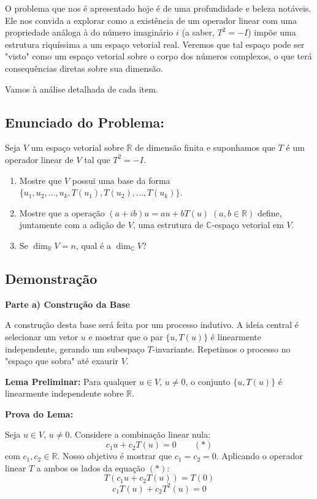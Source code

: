 O problema que nos é apresentado hoje é de uma profundidade e beleza notáveis. Ele nos convida a
explorar como a existência de um operador linear com uma propriedade análoga à do número
imaginário $i$ (a saber, $T^2=-I$) impõe uma estrutura riquíssima a um espaço vetorial real. Veremos
que tal espaço pode ser "visto" como um espaço vetorial sobre o corpo dos números complexos, o
que terá consequências diretas sobre sua dimensão.

Vamos à análise detalhada de cada item.

\subsection*{Enunciado do Problema:}

Seja $V$ um espaço vetorial sobre $\mathbb{R}$ de dimensão finita e suponhamos que $T$ é um operador linear de
$V$ tal que $T^2=-I$.

\begin{enumerate}[label=\alph*)]
\item Mostre que $V$ possui uma base da forma $\{u_1,u_2,\ldots,u_k,T(u_1),T(u_2),\ldots,T(u_k)\}$.

\item Mostre que a operação $(a+ib)u=au+bT(u)\;(a,b\in\mathbb{R})$ define, juntamente com a
adição de $V$, uma estrutura de $\mathbb{C}$-espaço vetorial em $V$.

\item Se $\dim_{\mathbb{R}} V=n$, qual é a $\dim_{\mathbb{C}} V$?
\end{enumerate}

\subsection*{Demonstração}

\textbf{Parte a) Construção da Base}

A construção desta base será feita por um processo indutivo. A ideia central é selecionar um vetor $u$
e mostrar que o par $\{u,T(u)\}$ é linearmente independente, gerando um subespaço $T$-invariante.
Repetimos o processo no "espaço que sobra" até exaurir $V$.

\textbf{Lema Preliminar:} Para qualquer $u\in V$, $u\neq 0$, o conjunto $\{u,T(u)\}$ é linearmente independente
sobre $\mathbb{R}$.

\textbf{Prova do Lema:}

Seja $u\in V$, $u\neq 0$. Considere a combinação linear nula:
\[
c_1u+c_2T(u)=0 \quad\quad (*)
\]
com $c_1,c_2\in\mathbb{R}$. Nosso objetivo é mostrar que $c_1=c_2=0$.
Aplicando o operador linear $T$ a ambos os lados da equação $(*)$:
\[
T(c_1u+c_2T(u))=T(0)
\]
\[
c_1T(u)+c_2T^2(u)=0
\]

